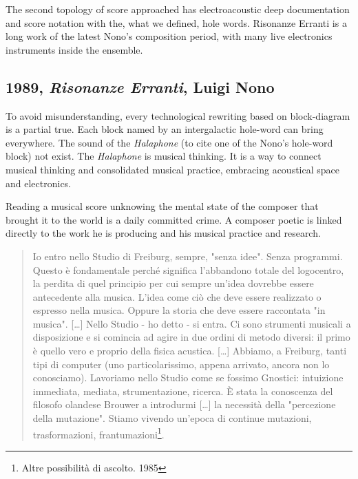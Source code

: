 \documentclass[twoside,a4paper]{article}
\begin{document}
The second topology of score approached has electroacoustic deep documentation and score notation with the, what we defined, hole words. Risonanze Erranti is a long work of the latest Nono's composition period, with many live electronics instruments inside the ensemble. 


\subsection{1989, \emph{Risonanze Erranti}, Luigi Nono}

To avoid misunderstanding, every technological rewriting based on block-diagram is a partial true. Each block named by an intergalactic hole-word can bring everywhere. The sound of the \emph{Halaphone} (to cite one of the Nono's hole-word block) not exist. The \emph{Halaphone} is musical thinking. It is a way to connect musical thinking and consolidated musical practice, embracing acoustical space and electronics. 

Reading a musical score unknowing the mental state of the composer that brought it to the world is a daily committed crime. A composer poetic is linked directly to the work he is producing and his musical practice and research.

\begin{quote}
Io entro nello Studio di Freiburg, sempre, "senza idee". Senza programmi. Questo è fondamentale perché significa l'abbandono totale del logocentro, la perdita di quel principio per cui sempre un'idea dovrebbe essere antecedente alla musica. L'idea come ciò che deve essere realizzato o espresso nella musica. Oppure la storia che deve essere raccontata "in musica". [\ldots] Nello Studio - ho detto - si entra. Ci sono strumenti musicali a disposizione e si comincia ad agire in due ordini di metodo diversi: il primo è quello vero e proprio della fisica acustica. [\ldots] Abbiamo, a Freiburg, tanti tipi di computer (uno particolarissimo, appena arrivato, ancora non lo conosciamo). Lavoriamo nello Studio come se fossimo Gnostici: intuizione immediata, mediata, strumentazione, ricerca. È stata la conoscenza del filosofo olandese Brouwer a introdurmi [\ldots] la necessità della "percezione della mutazione". Stiamo vivendo un'epoca di continue mutazioni, trasformazioni, frantumazioni\footnote{Altre possibilità di ascolto. 1985}. 
\end{quote}
\end{document}

